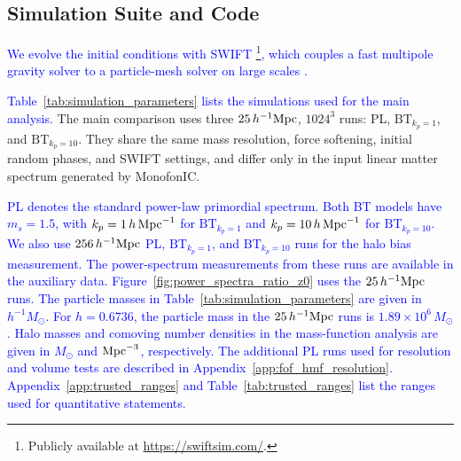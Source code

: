 \documentclass[
 reprint,
 superscriptaddress,
 nofootinbib,
 nobibnotes,
 amsmath,
 amssymb,
 aps,
 prd,
 floatfix,
 longbibliography
]{revtex4-2}
\DeclareRobustCommand{\change}[1]{\textcolor{blue}{#1}}
\DeclareRobustCommand{\BTKPone}{\ensuremath{\mathrm{BT}_{k_p=1}}}
\DeclareRobustCommand{\BTKPten}{\ensuremath{\mathrm{BT}_{k_p=10}}}
\begin{document}
\subsection{Simulation Suite and Code}
\label{subsec:simulation_suite}
\label{subsec:Terminology}

\change{We evolve the initial conditions with \textsc{SWIFT} \citep{Schaller2024SWIFT}\footnote{Publicly available at \url{https://swiftsim.com/}.}, which couples a fast multipole gravity solver \citep{Dehn00FMM} to a particle-mesh solver on large scales \citep{Hock88PM}.}

\change{Table~\ref{tab:simulation_parameters} lists the simulations used for the main analysis.} The main comparison uses three \(25\,h^{-1}{\rm Mpc}\), \(1024^3\) runs: PL, \BTKPone{}, and \BTKPten{}. They share the same mass resolution, force softening, initial random phases, and \textsc{SWIFT} settings, and differ only in the input linear matter spectrum generated by MonofonIC.




\change{PL denotes the standard power-law primordial spectrum. Both BT models have \(m_s=1.5\), with \(k_p=1\,h\,{\rm Mpc}^{-1}\) for \BTKPone{} and \(k_p=10\,h\,{\rm Mpc}^{-1}\) for \BTKPten{}. We also use \(256\,h^{-1}{\rm Mpc}\) PL, \BTKPone{}, and \BTKPten{} runs for the halo bias measurement. The power-spectrum measurements from these runs are available in the auxiliary data. Figure~\ref{fig:power_spectra_ratio_z0} uses the \(25\,h^{-1}{\rm Mpc}\) runs. The particle masses in Table~\ref{tab:simulation_parameters} are given in \(h^{-1}M_\odot\). For \(h=0.6736\), the particle mass in the \(25\,h^{-1}{\rm Mpc}\) runs is \(1.89\times10^6\,M_\odot\). Halo masses and comoving number densities in the mass-function analysis are given in \(M_\odot\) and \({\rm Mpc}^{-3}\), respectively. The additional PL runs used for resolution and volume tests are described in Appendix~\ref{app:fof_hmf_resolution}. Appendix~\ref{app:trusted_ranges} and Table~\ref{tab:trusted_ranges} list the ranges used for quantitative statements.}
\end{document}
